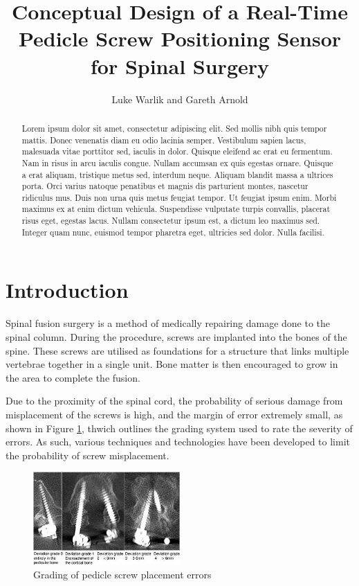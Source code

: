 \documentclass[conference, a4paper]{IEEEtran}
\begin{document}
%
\title{Conceptual Design of a Real-Time Pedicle Screw Positioning Sensor for
Spinal Surgery}
\author{Luke Warlik and Gareth Arnold}


\maketitle


\begin{abstract}
	Lorem ipsum dolor sit amet, consectetur adipiscing elit. Sed mollis nibh quis tempor mattis. Donec venenatis diam eu odio lacinia semper. Vestibulum sapien lacus, malesuada vitae porttitor sed, iaculis in dolor. Quisque eleifend ac erat eu fermentum. Nam in risus in arcu iaculis congue. Nullam accumsan ex quis egestas ornare. Quisque a erat aliquam, tristique metus sed, interdum neque. Aliquam blandit massa a ultrices porta. Orci varius natoque penatibus et magnis dis parturient montes, nascetur ridiculus mus. Duis non urna quis metus feugiat tempor. Ut feugiat ipsum enim. Morbi maximus ex at enim dictum vehicula. Suspendisse vulputate turpis convallis, placerat risus eget, egestas lacus. Nullam consectetur ipsum est, a dictum leo maximus sed. Integer quam nunc, euismod tempor pharetra eget, ultricies sed dolor. Nulla facilisi.
\end{abstract}


\section{Introduction}

Spinal fusion surgery is a method of medically repairing damage done to the spinal column. During the
procedure, screws are implanted into the bones of the spine. These screws are utilised as foundations for a
structure that links multiple vertebrae together in a single unit. Bone matter is then encouraged to grow in the
area to complete the fusion\cite{Manbachi2014}.

Due to the proximity of the spinal cord, the probability of serious damage from
misplacement of the screws is high, and the margin of error extremely small, as shown in Figure \ref{fig:dev}, 
thwich outlines the grading system used to rate the severity of errors.
As such, various techniques and technologies have been developed to limit the probability of screw misplacement\cite{neuro}.

\begin{figure}[h!]
	\centering
	\includegraphics[width=0.5\textwidth]{assets/deviation.jpg}
	\caption{Grading of pedicle screw placement errors}
	\label{fig:dev}
\end{figure}
\end{document}
